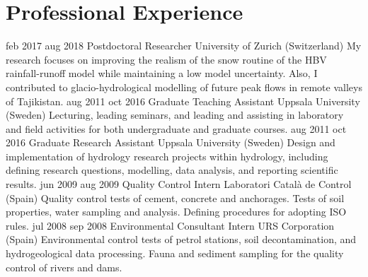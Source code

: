     \section{Professional Experience}
        \position
            {feb 2017 \textemdash{} aug 2018}
            {Postdoctoral Researcher}
            {University of Zurich (Switzerland)}
            {My research focuses on improving the realism of the snow routine of the HBV rainfall-runoff model while maintaining a low model uncertainty. Also, I contributed to glacio-hydrological modelling of future peak flows in remote valleys of Tajikistan.}
        \position
            {aug 2011 \textemdash{} oct 2016}
            {Graduate Teaching Assistant}
            {Uppsala University (Sweden)}
            {Lecturing, leading seminars, and leading and assisting in laboratory and field activities for both undergraduate and graduate courses.}
        \position
            {aug 2011 \textemdash{} oct 2016}
            {Graduate Research Assistant}
            {Uppsala University (Sweden)}
            {Design and implementation of hydrology research projects within hydrology, including defining research questions, modelling, data analysis, and reporting scientific results.}
        \position
            {jun 2009 \textemdash{} aug 2009}
            {Quality Control Intern}
            {Laboratori Català de Control (Spain)}
            {Quality control tests of cement, concrete and anchorages. Tests of soil properties, water sampling and analysis. Defining procedures for adopting ISO rules.}
        \position
            {jul 2008 \textemdash{} sep 2008}
            {Environmental Consultant Intern}
            {URS Corporation (Spain)}
            {Environmental control tests of petrol stations, soil decontamination, and hydrogeological data processing. Fauna and sediment sampling for the quality control of rivers and dams.}
\fi

